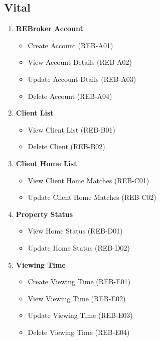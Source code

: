 \documentclass[11pt]{article}
\begin{document}
		\subsection{Vital}
		\begin{enumerate}[i]
			\item \textbf{REBroker Account}
			\begin{itemize}
				\item Create Account (REB-A01)
				\item View Account Details (REB-A02)
				\item Update Account Dtails (REB-A03)
				\item Delete Account (REB-A04)
			\end{itemize}
			
			\item \textbf{Client List}
			\begin{itemize}
				\item View Client List (REB-B01)
				\item Delete Client (REB-B02)
			\end{itemize}
			
			\item \textbf{Client Home List}
			\begin{itemize}
				\item View Client Home Matches (REB-C01)
				\item Update Client Home Matches (REB-C02)
			\end{itemize}
			
			\item \textbf{Property Status}
			\begin{itemize}
				\item View Home Status (REB-D01)
				\item Update Home Status (REB-D02)
			\end{itemize}
			\item \textbf{Viewing Time}
			\begin{itemize}
				\item Create Viewing Time (REB-E01)
				\item View Viewing Time (REB-E02)
				\item Update Viewing Time (REB-E03)
				\item Delete Viewing Time (REB-E04)
			\end{itemize}
		\end{enumerate}
		
\end{document}
